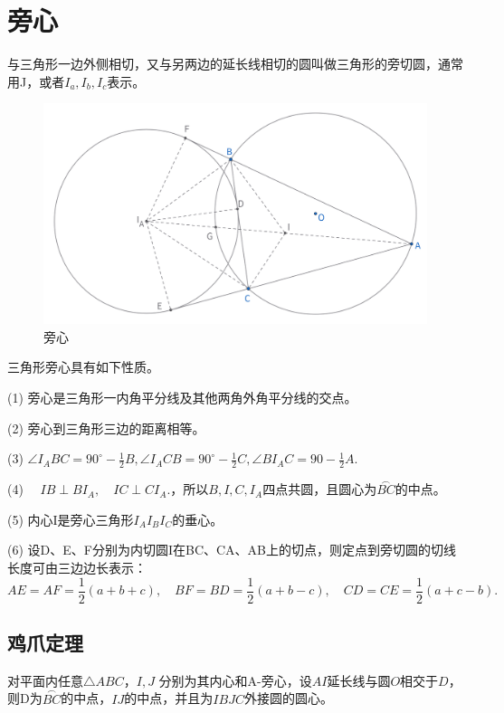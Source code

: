 \section{旁心}
\begin{definition}[旁心]
    与三角形一边外侧相切，又与另两边的延长线相切的圆叫做三角形的旁切圆，通常用J，或者$I_a,I_b,I_c$表示。    
\end{definition}

\begin{figure}[H]
    \centering
    \includegraphics[width=0.6\linewidth]{figures/三角形五心/旁心.png}
    \caption{旁心}
\end{figure}


\begin{proposition}[旁心性质]
    三角形旁心具有如下性质。
    
    (1) 旁心是三角形一内角平分线及其他两角外角平分线的交点。

    (2) 旁心到三角形三边的距离相等。

    (3) $\angle I_ABC = 90^\circ - \frac{1}{2}B, \angle I_ACB = 90^\circ - \frac{1}{2}C, \angle BI_AC=90 - \frac{1}{2}A.$

    (4) $\quad IB\perp BI_A, \quad IC\perp CI_A.$，所以$B, I,C,I_A$四点共圆，且圆心为$\overset{\frown}{BC}$的中点。

    (5) 内心I是旁心三角形$I_AI_BI_C$的垂心。

    (6) 设D、E、F分别为内切圆I在BC、CA、AB上的切点，则定点到旁切圆的切线长度可由三边边长表示：
    $$
    AE=AF=\frac{1}{2}(a+b+c),\quad
    BF=BD=\frac{1}{2}(a+b-c),\quad 
    CD=CE=\frac{1}{2}(a+c - b).
    $$
\end{proposition}




\newpage 
\subsection{鸡爪定理}
\begin{theorem}[鸡爪定理]
    对平面内任意$\triangle ABC$，$I,J$ 分别为其内心和A-旁心，设$AI$延长线与圆$O$相交于$D$，则D为$\overset{{\frown}}{BC}$的中点，$IJ$的中点，并且为$IBJC$外接圆的圆心。
\end{theorem}


